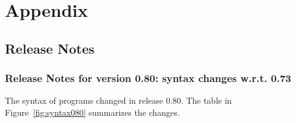 \documentclass[a4paper,11pt,twoside,openright]{memoir}
\begin{document}








% 








\part{Appendix}

\appendix

\chapter{Release Notes}

\section{Release Notes for version 0.80: syntax changes w.r.t. 0.73}

The syntax of \whyml programs changed in release 0.80.
The table in Figure~\ref{fig:syntax080} summarizes the changes.
\end{document}
